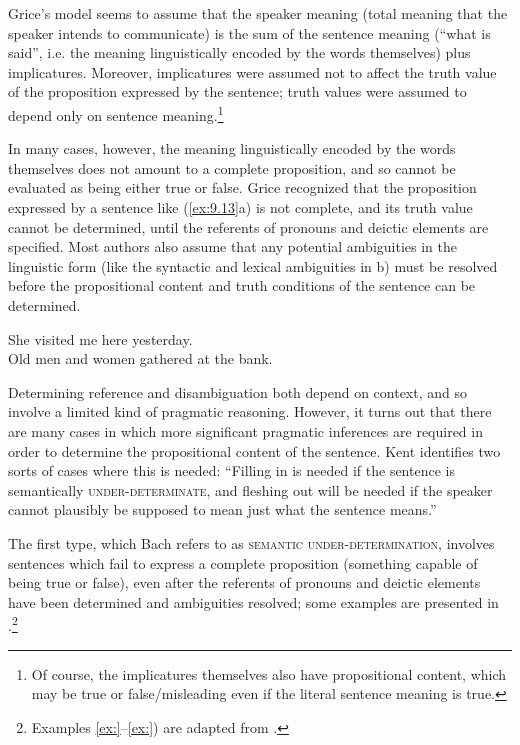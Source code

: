Grice’s model seems to assume that the speaker meaning (total meaning that the speaker intends to communicate) is the sum of the sentence meaning (“what is said”, i.e. the meaning linguistically encoded by the words themselves) plus implicatures. Moreover, implicatures were assumed not to affect the truth value of the proposition expressed by the sentence; truth values were assumed to depend only on sentence meaning.\footnote{Of course, the implicatures themselves also have propositional content, which may be true or false/misleading even if the literal sentence meaning is true.}



In many cases, however, the meaning linguistically encoded by the words themselves does not amount to a complete proposition, and so cannot be evaluated as being either true or false. Grice recognized that the proposition expressed by a sentence like (\ref{ex:9.13}a) is not complete, and its truth value cannot be determined, until the referents of pronouns and deictic elements are specified. Most authors also assume that any potential ambiguities in the linguistic form (like the syntactic and lexical ambiguities in b) must be resolved before the propositional content and truth conditions of the sentence can be determined.


\ea \label{ex:9.13}
\ea She visited me here yesterday.\\
\ex Old men and women gathered at the bank.
                       \z
\z


Determining reference and disambiguation both depend on context, and so involve a limited kind of pragmatic reasoning. However, it turns out that there are many cases in which more significant pragmatic inferences are required in order to determine the propositional content of the sentence. Kent \citet{Bach1994} identifies two sorts of cases where this is needed: “Filling in is needed if the sentence is semantically \textsc{under-determinate}, and fleshing out will be needed if the speaker cannot plausibly be supposed to mean just what the sentence means.”



The first type, which Bach refers to as \textsc{semantic under-determination}, involves sentences which fail to express a complete proposition (something capable of being true or false), even after the referents of pronouns and deictic elements have been determined and ambiguities resolved; some examples are presented in .\footnote{Examples \ref{ex:}–\ref{ex:}) are adapted from \citet{Bach1994}.}


